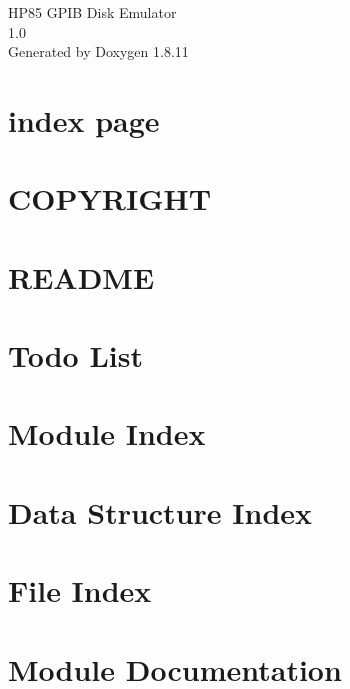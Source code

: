 \documentclass[twoside]{book}
\newcommand{\+}{\discretionary{\mbox{\scriptsize$\hookleftarrow$}}{}{}}
\newcommand{\clearemptydoublepage}{%
  \newpage{\pagestyle{empty}\cleardoublepage}%
}
\begin{document}
\hypersetup{pageanchor=false,
             bookmarksnumbered=true,
             pdfencoding=unicode
            }
\begin{titlepage}
\vspace*{7cm}
\begin{center}%
{\Large H\+P85 G\+P\+IB Disk Emulator \\[1ex]\large 1.\+0 }\\
\vspace*{1cm}
{\large Generated by Doxygen 1.8.11}\\
\end{center}
\end{titlepage}
\clearemptydoublepage
\tableofcontents
\clearemptydoublepage
{}
\hypersetup{pageanchor=true}

\chapter{index page}
\label{index}\hypertarget{index}{}
\chapter{C\+O\+P\+Y\+R\+I\+G\+HT}
\label{md_COPYRIGHT}
\hypertarget{md_COPYRIGHT}{}

\chapter{R\+E\+A\+D\+ME}
\label{md_README}
\hypertarget{md_README}{}

\chapter{Todo List}
\label{todo}
\hypertarget{todo}{}

\chapter{Module Index}

\chapter{Data Structure Index}

\chapter{File Index}

\chapter{Module Documentation}

\end{document}
